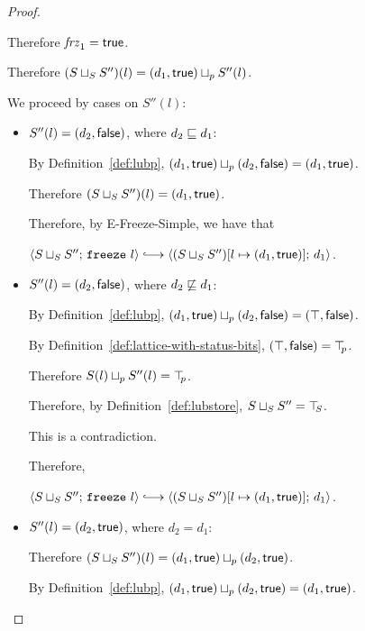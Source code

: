 \begin{proof}
\begin{itemize}
\begin{itemize}
        Therefore $\mathit{frz}_1 = \textsf{true}$.

        Therefore $(S \sqcup_{S} S'')(l) =
        (d_1, \textsf{true}) \sqcup_p S''(l)$.
        
        We proceed by cases on $S''(l)$:
        \begin{itemize}
        \item $S''(l) = (d_2, \textsf{false})$, where $d_2 \sqsubseteq d_1$:

          By Definition~\ref{def:lubp},
          $(d_1, \textsf{true}) \sqcup_p (d_2, \textsf{false}) =
          (d_1, \textsf{true})$.

          Therefore $(S \sqcup_{S} S'')(l) =
          (d_1, \textsf{true})$.

          Therefore, by {\sc E-Freeze-Simple}, we have that

          $\config{\lubstore{S}{S''}}{\freeze{l}}
          \parstepsto
          \config{\extS{(\lubstore{S}{S''})}{l}{d_1}{\frozentrue}}{d_1}$.

        \item $S''(l) = (d_2, \textsf{false})$, where $d_2 \not \sqsubseteq d_1$:

          By Definition~\ref{def:lubp},
          $(d_1, \textsf{true}) \sqcup_p (d_2, \textsf{false})
          = (\top, \textsf{false})$.

          By Definition~\ref{def:lattice-with-status-bits},
          $(\top, \textsf{false}) = \top\hspace{-0.85mm}_{p}$.

          Therefore $S(l) \sqcup_p S''(l) = \top\hspace{-0.85mm}_{p}$.

          Therefore, by Definition~\ref{def:lubstore},
          $S \sqcup_{S} S'' = \top\hspace{-0.85mm}_{S}$.

          This is a contradiction.

          Therefore,

          $\config{\lubstore{S}{S''}}{\freeze{l}}
          \parstepsto
          \config{\extS{(\lubstore{S}{S''})}{l}{d_1}{\frozentrue}}{d_1}$.

        \item $S''(l) = (d_2, \textsf{true})$, where $d_2 = d_1$:

          Therefore $(S \sqcup_{S} S'')(l) =
          (d_1, \textsf{true}) \sqcup_p (d_2, \textsf{true})$.

          By Definition~\ref{def:lubp},
          $(d_1, \textsf{true}) \sqcup_p (d_2, \textsf{true}) =
          (d_1, \textsf{true})$.


\end{itemize}
\end{itemize}
\end{itemize}
\end{proof}
